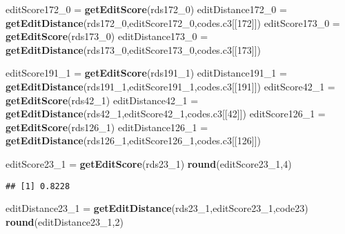 \documentclass[
]{article}
\newenvironment{Shaded}{\begin{snugshade}}{\end{snugshade}}
\newcommand{\DecValTok}[1]{\textcolor[rgb]{0.00,0.00,0.81}{#1}}
\newcommand{\KeywordTok}[1]{\textcolor[rgb]{0.13,0.29,0.53}{\textbf{#1}}}
\newcommand{\NormalTok}[1]{#1}
\newcommand{\StringTok}[1]{\textcolor[rgb]{0.31,0.60,0.02}{#1}}
\begin{document}
\begin{Shaded}
\begin{Highlighting}[]
\NormalTok{editScore172_}\DecValTok{0}\NormalTok{ =}\StringTok{ }\KeywordTok{getEditScore}\NormalTok{(rds172_}\DecValTok{0}\NormalTok{)}
\NormalTok{editDistance172_}\DecValTok{0}\NormalTok{ =}\StringTok{ }\KeywordTok{getEditDistance}\NormalTok{(rds172_}\DecValTok{0}\NormalTok{,editScore172_}\DecValTok{0}\NormalTok{,codes.c3[[}\DecValTok{172}\NormalTok{]])}
\NormalTok{editScore173_}\DecValTok{0}\NormalTok{ =}\StringTok{ }\KeywordTok{getEditScore}\NormalTok{(rds173_}\DecValTok{0}\NormalTok{)}
\NormalTok{editDistance173_}\DecValTok{0}\NormalTok{ =}\StringTok{ }\KeywordTok{getEditDistance}\NormalTok{(rds173_}\DecValTok{0}\NormalTok{,editScore173_}\DecValTok{0}\NormalTok{,codes.c3[[}\DecValTok{173}\NormalTok{]])}

\NormalTok{editScore191_}\DecValTok{1}\NormalTok{ =}\StringTok{ }\KeywordTok{getEditScore}\NormalTok{(rds191_}\DecValTok{1}\NormalTok{)}
\NormalTok{editDistance191_}\DecValTok{1}\NormalTok{ =}\StringTok{ }\KeywordTok{getEditDistance}\NormalTok{(rds191_}\DecValTok{1}\NormalTok{,editScore191_}\DecValTok{1}\NormalTok{,codes.c3[[}\DecValTok{191}\NormalTok{]])}
\NormalTok{editScore42_}\DecValTok{1}\NormalTok{ =}\StringTok{ }\KeywordTok{getEditScore}\NormalTok{(rds42_}\DecValTok{1}\NormalTok{)}
\NormalTok{editDistance42_}\DecValTok{1}\NormalTok{ =}\StringTok{ }\KeywordTok{getEditDistance}\NormalTok{(rds42_}\DecValTok{1}\NormalTok{,editScore42_}\DecValTok{1}\NormalTok{,codes.c3[[}\DecValTok{42}\NormalTok{]])}
\NormalTok{editScore126_}\DecValTok{1}\NormalTok{ =}\StringTok{ }\KeywordTok{getEditScore}\NormalTok{(rds126_}\DecValTok{1}\NormalTok{)}
\NormalTok{editDistance126_}\DecValTok{1}\NormalTok{ =}\StringTok{ }\KeywordTok{getEditDistance}\NormalTok{(rds126_}\DecValTok{1}\NormalTok{,editScore126_}\DecValTok{1}\NormalTok{,codes.c3[[}\DecValTok{126}\NormalTok{]])}

\NormalTok{editScore23_}\DecValTok{1}\NormalTok{ =}\StringTok{ }\KeywordTok{getEditScore}\NormalTok{(rds23_}\DecValTok{1}\NormalTok{)}
\KeywordTok{round}\NormalTok{(editScore23_}\DecValTok{1}\NormalTok{,}\DecValTok{4}\NormalTok{)}
\end{Highlighting}
\end{Shaded}

\begin{verbatim}
## [1] 0.8228
\end{verbatim}

\begin{Shaded}
\begin{Highlighting}[]
\NormalTok{editDistance23_}\DecValTok{1}\NormalTok{ =}\StringTok{ }\KeywordTok{getEditDistance}\NormalTok{(rds23_}\DecValTok{1}\NormalTok{,editScore23_}\DecValTok{1}\NormalTok{,code23)}
\KeywordTok{round}\NormalTok{(editDistance23_}\DecValTok{1}\NormalTok{,}\DecValTok{2}\NormalTok{)}
\end{Highlighting}
\end{Shaded}
\end{document}
